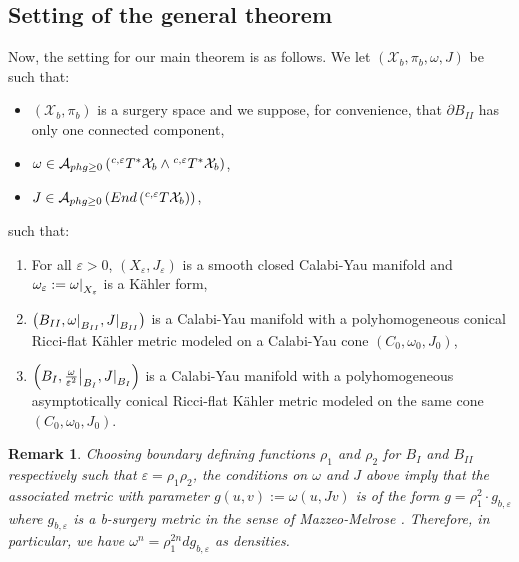 \documentclass[a4paper,11pt]{article}
\newcounter{mythm}[section]
\newtheorem{rem}[mythm]{Remark}
\newcommand\restr[2]{{%
  \left.\kern-\nulldelimiterspace %
  #1 %
  \littletaller %
  \right|_{#2} %
  }}
\newcommand{\littletaller}{\mathchoice{\vphantom{\big|}}{}{}{}}
\begin{document}
\subsection{Setting of the general theorem} 
Now, the setting for our main theorem is as follows. We let $\left(\mathcal{X}_b, \pi_b, \omega, J \right)$ be such that:
    \begin{itemize}
    \item $(\mathcal{X}_b , \pi_b)$ is a surgery space and we suppose, for convenience, that $\partial B_{II}$ has only one connected component,
    \item $\omega \in \mathcal{A}_{phg \geq 0} \left( \hspace{0.01cm} ^{c,\varepsilon} T^{*} \mathcal{X}_b \wedge \hspace{0.01cm} ^{c,\varepsilon} T^{*} \mathcal{X}_b \right)$,
    \item $J \in \mathcal{A}_{phg \geq 0} \left( End \left( \hspace{0.01cm} ^{c,\varepsilon} T \mathcal{X}_b \right) \right)$,
    \end{itemize}
    such that:
    \begin{enumerate}
        \item For all $\varepsilon >0$,  $(X_\varepsilon, J_\varepsilon)$ is a smooth closed Calabi-Yau manifold and $\omega_\varepsilon := \restr{\omega}{X_\varepsilon}$ is a Kähler form,
        \item $\left(B_{II}, \restr{\omega}{B_{II}}, \restr{J}{B_{II}}\right)$ is a Calabi-Yau manifold with a polyhomogeneous conical Ricci-flat Kähler metric modeled on a Calabi-Yau cone $\left(C_0, \omega_{0}, J_0 \right)$,
        \item $\left(B_{I}, \restr{\frac{\omega}{\varepsilon^2}}{B_{I}}, \restr{J}{B_{I}}\right)$ is a Calabi-Yau manifold with a polyhomogeneous asymptotically conical Ricci-flat Kähler metric modeled on the same cone $\left(C_0, \omega_{0}, J_0 \right)$. 
     \end{enumerate}
     
    \begin{rem} \label{remden}
    Choosing boundary defining functions $\rho_1$ and $\rho_2$ for $B_{I}$ and $B_{II}$ respectively such that $\varepsilon = \rho_1 \rho_2$, the conditions on $\omega$ and $J$ above imply that the associated metric with parameter $g(u,v) := \omega(u, Jv) $ is of the form $g = \rho_1^2 \cdot g_{b, \varepsilon}$ where $g_{b, \varepsilon}$ is a b-surgery metric in the sense of Mazzeo-Melrose \cite{melrose_analytic_1995}. Therefore, in particular, we have $\omega^n = \rho_1^{2n} d g_{b, \varepsilon}$ as densities.
    \end{rem}
\end{document}
